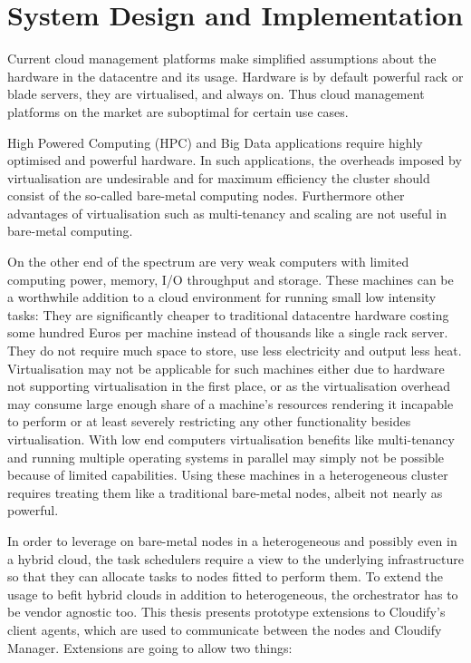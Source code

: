 \section{System Design and Implementation}

Current cloud management platforms make simplified assumptions about the hardware in the datacentre and its usage. Hardware is by default powerful rack or blade servers, they are virtualised, and always on. Thus cloud management platforms on the market are suboptimal for certain use cases.

High Powered Computing (HPC) and Big Data applications require highly optimised and powerful hardware. In such applications, the overheads imposed by virtualisation are undesirable and for maximum efficiency the cluster should consist of the so-called bare-metal computing nodes. Furthermore other advantages of virtualisation such as multi-tenancy and scaling are not useful in bare-metal computing.

On the other end of the spectrum are very weak computers with limited computing power, memory, I/O throughput and storage. These machines can be a worthwhile addition to a cloud environment for running small low intensity tasks: They are significantly cheaper to traditional datacentre hardware costing some hundred Euros per machine instead of thousands like a single rack server. They do not require much space to store, use less electricity and output less heat. Virtualisation may not be applicable for such machines either due to hardware not supporting virtualisation in the first place, or as the virtualisation overhead may consume large enough share of a machine's resources rendering it incapable to perform or at least severely restricting any other functionality besides virtualisation. With low end computers virtualisation benefits like multi-tenancy and running multiple operating systems in parallel may simply not be possible because of limited capabilities. Using these machines in a heterogeneous cluster requires treating them like a traditional bare-metal nodes, albeit not nearly as powerful.

In order to leverage on bare-metal nodes in a heterogeneous and possibly even in a hybrid cloud, the task schedulers require a view to the underlying infrastructure so that they can allocate tasks to nodes fitted to perform them. To extend the usage to befit hybrid clouds in addition to heterogeneous, the orchestrator has to be vendor agnostic too. This thesis presents prototype extensions to Cloudify's \cite{cloudify} client agents, which are used to communicate between the nodes and Cloudify Manager. Extensions are going to allow two things:

